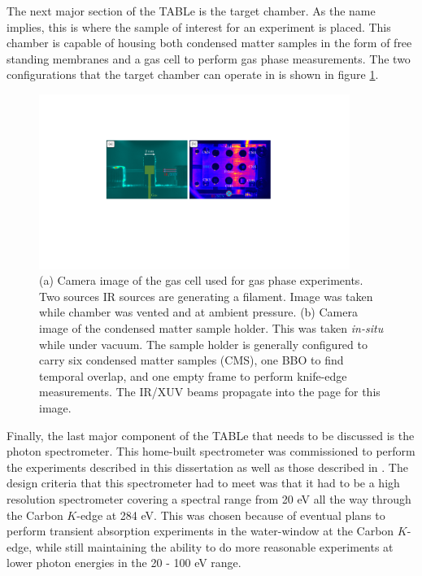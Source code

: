 The next major section of the TABLe is the target chamber.  As the name implies, this is where the sample of interest for an experiment is placed.  This chamber is capable of housing both condensed matter samples in the form of free standing membranes and a gas cell to perform gas phase measurements.  The two configurations that the target chamber can operate in is shown in figure \ref{fig:gas_solid_sample_holder}. 
\begin{figure}
	\centering
	\includegraphics[width=0.9\textwidth]{figures/Beamline/gas_solid_sample_holder.pdf}
	\caption[Camera image of target gas cell and condensed matter sample holder]{(a) Camera image of the gas cell used for gas phase experiments. Two sources IR sources are generating a filament. Image was taken while chamber was vented and at ambient pressure. (b) Camera image of the condensed matter sample holder.  This was taken \textit{in-situ} while under vacuum.  The sample holder is generally configured to carry six condensed matter samples (CMS), one BBO to find temporal overlap, and one empty frame to perform knife-edge measurements.  The IR/XUV beams propagate into the page for this image.}
	\label{fig:gas_solid_sample_holder}
\end{figure}

Finally, the last major component of the TABLe that needs to be discussed is the photon spectrometer.  This home-built spectrometer was commissioned to perform the experiments described in this dissertation as well as those described in \cite{smithApplicationAttosecondTechniques2020}.  The design criteria that this spectrometer had to meet was that it had to be a high resolution spectrometer covering a spectral range from 20 eV all the way through the Carbon $K$-edge at 284 eV.  This was chosen because of eventual plans to perform transient absorption experiments in the water-window at the Carbon $K$-edge, while still maintaining the ability to do more reasonable experiments at lower photon energies in the 20 - 100 eV range.

